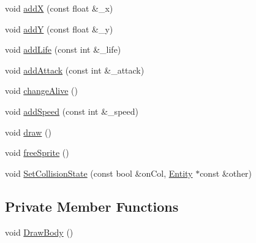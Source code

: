 \begin{DoxyCompactItemize}
\item 
void \hyperlink{class_entity_a59d99a7f50548a97b5dbd6fa4c86cf74}{addX} (const float \&\+\_\+x)
\item 
void \hyperlink{class_entity_a38b1024628b023e95781ca94917acfef}{addY} (const float \&\+\_\+y)
\item 
void \hyperlink{class_entity_ad7ede2df84a14540f70acc4688b2d239}{add\+Life} (const int \&\+\_\+life)
\item 
void \hyperlink{class_entity_a4c5215758a9cda8418823d4d878315c6}{add\+Attack} (const int \&\+\_\+attack)
\item 
void \hyperlink{class_entity_a6f03954ccfcbe4835286543d19c7fae3}{change\+Alive} ()
\item 
void \hyperlink{class_entity_ae719bdd116440d6791f609c8d4037462}{add\+Speed} (const int \&\+\_\+speed)
\item 
void \hyperlink{class_entity_a7666f416dd0d1fce0f1133f78df44476}{draw} ()
\item 
void \hyperlink{class_entity_a6adec3bcec396133896aaecdb13f87e0}{free\+Sprite} ()
\item 
void \hyperlink{class_entity_ac440ee8ac6f48c24176229ad9d36c2a7}{Set\+Collision\+State} (const bool \&on\+Col, \hyperlink{class_entity}{Entity} $\ast$const \&other)
\end{DoxyCompactItemize}
\subsection*{Private Member Functions}
\begin{DoxyCompactItemize}
\item 
void \hyperlink{class_entity_a947298b3c4449adee232c1d1f589de8c}{Draw\+Body} ()
\end{DoxyCompactItemize}
